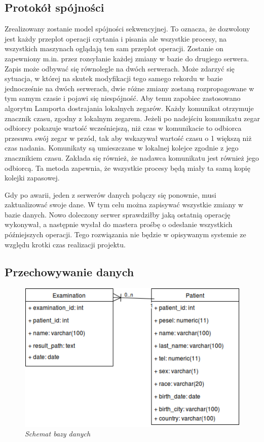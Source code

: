 \subsection{Protokół spójności}
Zrealizowany zostanie model spójności sekwencyjnej. To oznacza, że dozwolony jest każdy przeplot operacji czytania i pisania ale wszystkie procesy, na wszystkich maszynach oglądają ten sam przeplot operacji. Zostanie on zapewniony m.in. przez rozsyłanie każdej zmiany w bazie do drugiego serwera. Zapis może odbywać się równolegle na dwóch serwerach. Może zdarzyć się sytuacja, w której na skutek modyfikacji tego samego rekordu w bazie jednocześnie na dwóch serwerach, dwie różne zmiany zostaną rozpropagowane w tym samym czasie i pojawi się niespójność. Aby temu zapobiec zastosowano algorytm Lamporta dostrajania lokalnych zegarów. Każdy komunikat otrzymuje znacznik czasu, zgodny z lokalnym zegarem. Jeżeli po nadejściu komunikatu zegar odbiorcy pokazuje wartość wcześniejszą, niż czas w komunikacie to odbiorca przesuwa swój zegar w przód, tak aby wskazywał wartość czasu o 1 większą niż czas nadania. Komunikaty są umieszczane w lokalnej kolejce zgodnie z jego znacznikiem czasu. Zakłada się również, że nadawca komunikatu jest również jego odbiorcą. Ta metoda zapewnia, że wszystkie procesy będą miały ta samą kopię kolejki zapasowej.

Gdy po awarii, jeden z serwerów danych połączy się ponownie, musi zaktualizować swoje dane. W tym celu można zapisywać wszystkie zmiany w bazie danych. Nowo doleczony serwer sprawdziłby jaką ostatnią operację wykonywał, a następnie wysłał do mastera prośbę o odesłanie wszystkich późniejszych operacji. Tego rozwiązania nie będzie w opisywanym systemie ze względu krotki czas realizacji projektu.

\subsection{Przechowywanie danych}

\begin{figure}[!h]
    \begin{center}
    \includegraphics[angle=0,scale=0.6]{img/dbschema.png}
    \end{center}
    \caption{\em Schemat bazy danych}
    \label{fig:db_schema}
\end{figure}

